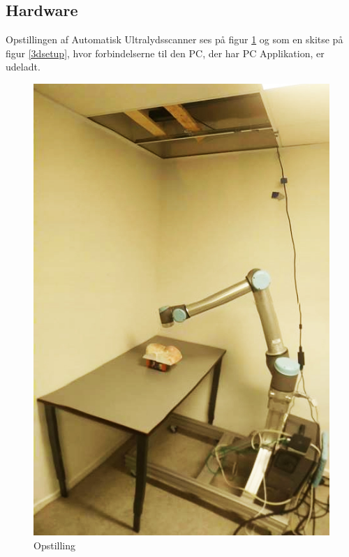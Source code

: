\subsection{Hardware}
Opstillingen af Automatisk Ultralydsscanner ses på figur \ref{setup} og som en skitse på figur \ref{3dsetup}, hvor forbindelserne til den PC, der har PC Applikation, er udeladt. 

\begin{figure}[H]
  \centering
  \begin{minipage}{0.4\textwidth}
    \includegraphics[width=\textwidth]{figurer/setup}
    \caption{Opstilling}
    \label{setup}
  \end{minipage}
  \hfill
  \begin{minipage}{0.4\textwidth}

\end{minipage}
\end{figure}
